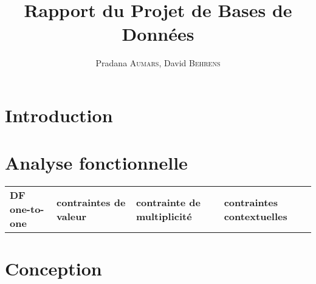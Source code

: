 \documentclass[12pt, a4paper]{article}
\title{Rapport du Projet de Bases de Données}
\author{Pradana \textsc{Aumars}, David \textsc{Behrens}}
\begin{document}
\maketitle
\section{Introduction}
\section{Analyse fonctionnelle}
\begin{table}[h]
\scriptsize
\begin{tabular}{llll}
  \textbf{DF one-to-one} & \textbf{contraintes de valeur} & \textbf{contrainte de multiplicité} & \textbf{contraintes contextuelles} \\
\end{tabular}
\end{table}
\section{Conception}
\end{document}
